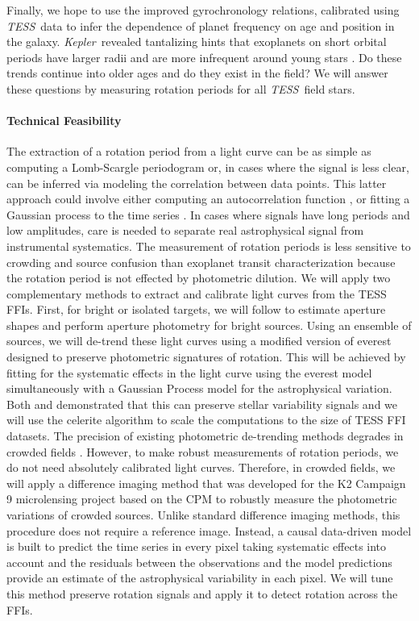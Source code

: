 \documentclass[letterpaper,12pt,preprint]{hack_aastex}
\newcommand{\Kepler}{{\it Kepler}}
\newcommand{\kepler}{\Kepler}
\newcommand{\TESS}{{\it TESS}}
\begin{document}
Finally, we hope to use the improved gyrochronology relations, calibrated
using \TESS\ data to infer the dependence of planet frequency on age and
position in the galaxy.
\kepler\ revealed tantalizing hints that exoplanets on short orbital periods
have larger radii and are more infrequent around young stars \citep{mann2017a,
mann2017b, rizzuto2017}.
Do these trends continue into older ages and do they exist in the field?
We will answer these questions by measuring rotation periods for all \TESS\
field stars.

\paragraph{Technical Feasibility}
The extraction of a rotation period from a light curve can be as simple as
computing a Lomb-Scargle periodogram or, in cases where the signal is less
clear, can be inferred via modeling the correlation between data points.
This latter approach could involve either computing an autocorrelation
function \citep{mcquillan2013}, or fitting a Gaussian process to the time
series \citep{angus2017, foreman-mackey2017}.
In cases where signals have long periods and low amplitudes, care is needed to
separate real astrophysical signal from instrumental systematics.
The measurement of rotation periods is less sensitive to crowding and source
confusion than exoplanet transit characterization because the rotation period
is not effected by photometric dilution.
We will apply two complementary methods to extract and calibrate light curves
from the TESS FFIs.
First, for bright or isolated targets, we will follow \citet{montet2017} to
estimate aperture shapes and perform aperture photometry for bright sources.
Using an ensemble of sources, we will de-trend these light curves using a
modified version of \textsf{everest} \citep{luger2016, luger2017} designed to
preserve photometric signatures of rotation.
This will be achieved by fitting for the systematic effects in the light curve
using the \textsf{everest} model simultaneously with a Gaussian Process model
for the astrophysical variation.
Both \citet{aigrain2016} and \citet{luger2016} demonstrated that this can
preserve stellar variability signals and we will use the \textsf{celerite}
algorithm \citep{dfm2017} to scale the computations to the size of TESS FFI
datasets.
The precision of existing photometric de-trending methods degrades in crowded
fields \citep[for example,][]{luger2017}.
However, to make robust measurements of rotation periods, we do not need
absolutely calibrated light curves.
Therefore, in crowded fields, we will apply a difference imaging method that
was developed for the K2 Campaign 9 microlensing project \citep{henderson2016}
based on the \textsf{CPM} \citep{wang2016} to robustly measure the photometric
variations of crowded sources.
Unlike standard difference imaging methods, this procedure does not require a
reference image.
Instead, a causal data-driven model is built to predict the time series in
every pixel taking systematic effects into account and the residuals between
the observations and the model predictions provide an estimate of the
astrophysical variability in each pixel.
We will tune this method preserve rotation signals and apply it to detect
rotation across the FFIs.
\end{document}
